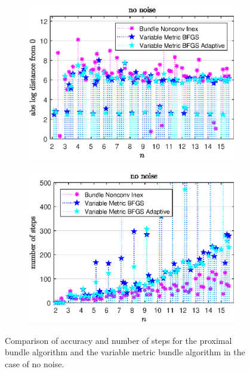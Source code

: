\begin{figure}[ht]%
	\begin{subfigure}{0.49\textwidth}
		\includegraphics[width=\textwidth]{Pictures/Plots/no_noise.eps}%
	\end{subfigure}%
	\hfill
	\begin{subfigure}{0.49\textwidth}
		\includegraphics[width=\textwidth]{Pictures/Plots/steps_no_noise.eps}%
	\end{subfigure}
	\caption[Accuracy and number of steps: no noise]{Comparison of accuracy and number of steps for the proximal bundle algorithm and the variable metric bundle algorithm in the case of no noise.}
	\label{fig_no_noise}
\end{figure}

